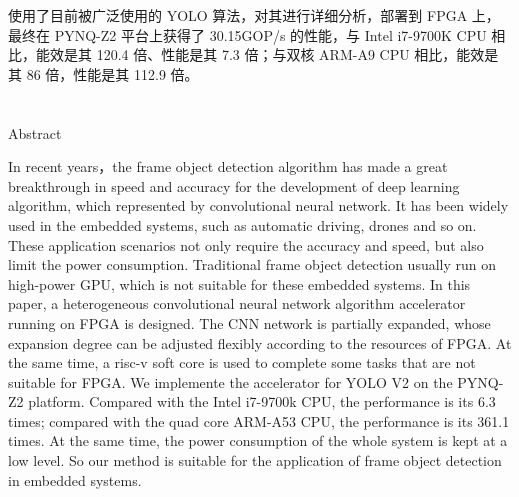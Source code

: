 使用了目前被广泛使用的 YOLO 算法，对其进行详细分析，部署到 FPGA 上，最终在 PYNQ-Z2 平台上获得了 30.15GOP/s 的性能，与 Intel i7-9700K CPU 相比，能效是其 120.4 倍、性能是其 7.3 倍；与双核 ARM-A9 CPU 相比，能效是其 86 倍，性能是其 112.9 倍。


{
}
\chapter[Abstract]{\MyTitleEn}

\begin{center}
\vspace{-0.3cm}
 \songti Abstract
\vspace{0.3cm}
\end{center}

In recent years，the frame object detection algorithm has made a great breakthrough in speed and accuracy for the development of deep learning algorithm, which represented by convolutional neural network. It has been widely used in the embedded systems, such as automatic driving, drones and so on. These application scenarios not only require the accuracy and speed, but also limit the power consumption. Traditional frame object detection usually run on high-power GPU, which is not suitable for these embedded systems. In this paper, a heterogeneous convolutional neural network algorithm accelerator running on FPGA is designed. The CNN network is partially expanded, whose expansion degree can be adjusted flexibly according to the resources of FPGA. At the same time, a risc-v soft core is used to complete some tasks that are not suitable for FPGA. We implemente the accelerator for YOLO V2 on the PYNQ-Z2 platform. Compared with the Intel i7-9700k CPU, the performance is its 6.3 times; compared with the quad core ARM-A53 CPU, the performance is its 361.1 times. At the same time, the power consumption of the whole system is kept at a low level. So our method is suitable for the application of frame object detection in embedded systems.


